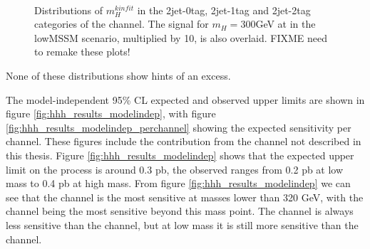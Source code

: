 \begin{figure}[h!]
\begin{center}
~\\
\end{center}
\caption{Distributions of $m_{H}^{kinfit}$ in the 2jet-0tag, 2jet-1tag and 2jet-2tag categories 
of the \etau channel. The \Htohhtobbtautau signal for $m_{H} = 300 $GeV at  in the low\tanb MSSM
scenario, multiplied by 10, is also overlaid. FIXME need to remake these plots!}
\label{fig:hhh_results_mhkinfit_etau}
\end{figure}

None of these distributions show hints of an excess.

The model-independent 95\% CL expected and observed upper limits are shown in 
figure \ref{fig:hhh_results_modelindep}, with figure \ref{fig:hhh_results_modelindep_perchannel}
showing the expected sensitivity per channel. These figures include the contribution from the 
\tautau channel not described in this thesis. Figure \ref{fig:hhh_results_modelindep} shows that
the expected upper limit on the \Htohhtobbtautau process is around 0.3 pb, the observed ranges
from 0.2 pb at low mass to 0.4 pb at high mass. From figure \ref{fig:hhh_results_modelindep}
we can see that the \mutau channel is the most sensitive at masses lower than 320 GeV, with 
the \tautau channel being the most sensitive beyond this mass point. The \etau channel is always
less sensitive than the \mutau channel, but at low mass it is still more sensitive than the \tautau 
channel.

